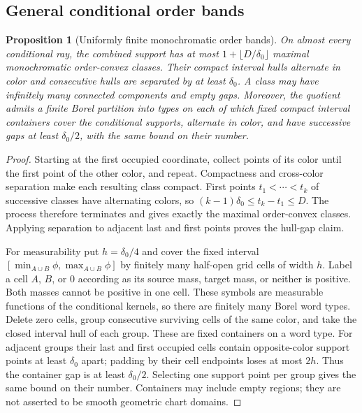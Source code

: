 \documentclass[11pt,reqno]{amsart}
\newtheorem{proposition}[theorem]{Proposition}
\theoremstyle{definition}
\theoremstyle{remark}
\numberwithin{equation}{section}
\begin{document}
\subsection{General conditional order bands}

\begin{proposition}[Uniformly finite monochromatic order bands]
\label{prop:ray-finite-bands}
On almost every conditional ray, the combined support has at most
\(1+\lfloor D/\delta_0\rfloor\) maximal monochromatic order-convex
classes. Their compact interval hulls alternate in color and consecutive
hulls are separated by at least \(\delta_0\). A class may have
infinitely many connected components and empty gaps.
Moreover, the quotient admits a finite Borel partition into types on
each of which fixed compact interval containers cover the conditional
supports, alternate in color, and have successive gaps at least
\(\delta_0/2\), with the same bound on their number.
\end{proposition}
\begin{proof}
Starting at the first occupied coordinate, collect points of its color
until the first point of the other color, and repeat. Compactness and
cross-color separation make each resulting class compact. First points
\(t_1<\cdots<t_k\) of successive classes have alternating colors,
so \((k-1)\delta_0\le t_k-t_1\le D\). The process therefore
terminates and gives exactly the maximal order-convex classes. Applying
separation to adjacent last and first points proves the hull-gap claim.

For measurability put \(h=\delta_0/4\) and cover the fixed interval
\([\min_{A\cup B}\phi,\max_{A\cup B}\phi]\) by finitely many
half-open grid cells of width \(h\). Label a cell \(A\), \(B\),
or \(0\) according as its source mass, target mass, or neither is
positive. Both masses cannot be positive in one cell. These symbols
are measurable functions of the conditional kernels, so there are
finitely many Borel word types. Delete zero cells, group consecutive
surviving cells of the same color, and take the closed interval hull
of each group. These are fixed containers on a word type.
For adjacent groups their last and first occupied cells contain
opposite-color support points at least \(\delta_0\) apart; padding
by their cell endpoints loses at most \(2h\). Thus the container
gap is at least \(\delta_0/2\). Selecting one support point per group
gives the same bound on their number. Containers may include empty
regions; they are not asserted to be smooth geometric chart domains.
\end{proof}
\end{document}
